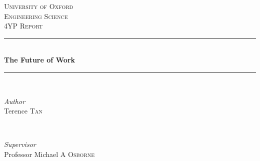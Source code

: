 \documentclass[11pt]{article}
\begin{document}
\begin{titlepage} %
	\newcommand{\HRule}{\rule{\linewidth}{0.5mm}} %
	
	\center %
	
	
	\textsc{\LARGE University of Oxford}\\[1.5cm] %
	
	\textsc{\Large Engineering Science}\\[0.5cm] %
	
	\textsc{\large 4YP Report}\\[0.5cm] %
	
	
	\HRule\\[0.4cm]
	
	{\huge\bfseries The Future of Work}\\[0.4cm] %
	
	\HRule\\[1.5cm]
	
	
	\begin{minipage}{0.4\textwidth}
		\begin{flushleft}
			\large
			\textit{Author}\\
			Terence \textsc{Tan} %
		\end{flushleft}
	\end{minipage}
	~
	\begin{minipage}{0.4\textwidth}
		\begin{flushright}
			\large
			\textit{Supervisor}\\
			Professor Michael A \textsc{Osborne} %
		\end{flushright}
	\end{minipage}
	
	

\end{titlepage}
\end{document}
